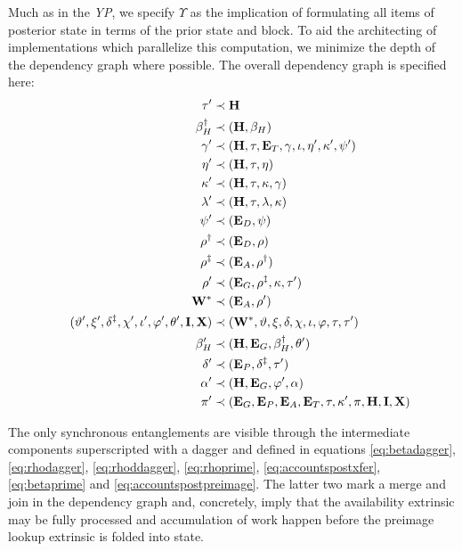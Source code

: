 Much as in the \emph{YP}, we specify $\Upsilon$ as the implication of formulating all items of posterior state in terms of the prior state and block. To aid the architecting of implementations which parallelize this computation, we minimize the depth of the dependency graph where possible. The overall dependency graph is specified here:
\begin{align}\label{eq:transitionfunctioncomposition}
  \tau' &\prec \theheader \\
  \recenthistory^\dagger &\prec (\theheader, \recenthistory) \label{eq:betadagger} \\
  \gamma' &\prec (\theheader, \tau, \xttickets, \gamma, \iota, \eta', \kappa', \psi') \\
  \eta' &\prec (\theheader, \tau, \eta) \\
  \kappa' &\prec (\theheader, \tau, \kappa, \gamma) \\
  \lambda' &\prec (\theheader, \tau, \lambda, \kappa) \\
  \psi' &\prec (\xtdisputes, \psi) \\
  \rho^\dagger &\prec (\xtdisputes, \rho) \label{eq:rhodagger} \\
  \rho^\ddagger &\prec (\xtassurances, \rho^\dagger) \label{eq:rhoddagger} \\
  \rho' &\prec (\xtguarantees, \rho^\ddagger, \kappa, \tau') \label{eq:rhoprime} \\
  \mathbf{W}^* &\prec (\xtassurances, \rho') \\
  (\ready', \accumulated', \accountspostxfer, \privileges', \iota', \varphi', \lastaccout', \mathbf{I}, \mathbf{X}) &\prec (\mathbf{W}^*, \ready, \accumulated, \accountspre, \privileges, \iota, \varphi, \tau, \tau') \label{eq:accountspostxfer} \\
  \recenthistory' &\prec (\theheader, \xtguarantees, \recenthistory^\dagger, \lastaccout') \label{eq:betaprime} \\
  \accountspostpreimage &\prec (\xtpreimages, \accountspostxfer, \tau') \label{eq:accountspostpreimage} \\
  \authpool' &\prec (\theheader, \xtguarantees, \varphi', \authpool) \\
  \pi' &\prec (\xtguarantees, \xtpreimages, \xtassurances, \xttickets, \tau, \kappa', \pi, \theheader, \mathbf{I}, \mathbf{X})\!\!\!\!\!\!\!\!
\end{align}

The only synchronous entanglements are visible through the intermediate components superscripted with a dagger and defined in equations \ref{eq:betadagger}, \ref{eq:rhodagger}, \ref{eq:rhoddagger}, \ref{eq:rhoprime}, \ref{eq:accountspostxfer}, \ref{eq:betaprime} and \ref{eq:accountspostpreimage}. The latter two mark a merge and join in the dependency graph and, concretely, imply that the availability extrinsic may be fully processed and accumulation of work happen before the preimage lookup extrinsic is folded into state.

